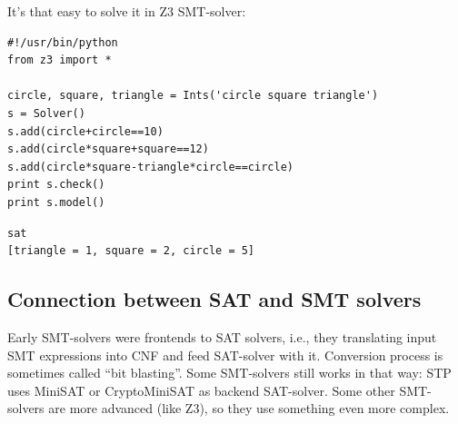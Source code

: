 It's that easy to solve it in Z3 \ac{SMT}-solver:

\begin{lstlisting}
#!/usr/bin/python
from z3 import *

circle, square, triangle = Ints('circle square triangle')
s = Solver()
s.add(circle+circle==10)
s.add(circle*square+square==12)
s.add(circle*square-triangle*circle==circle)
print s.check()
print s.model()
\end{lstlisting}

\begin{lstlisting}
sat
[triangle = 1, square = 2, circle = 5]
\end{lstlisting}



\subsection{Connection between \ac{SAT} and \ac{SMT} solvers}

Early \ac{SMT}-solvers were frontends to \ac{SAT} solvers, i.e., they translating input SMT expressions into \ac{CNF} and feed SAT-solver with it.
Conversion process is sometimes called ``bit blasting''.
Some \ac{SMT}-solvers still works in that way: STP uses MiniSAT or CryptoMiniSAT as backend SAT-solver.
Some other \ac{SMT}-solvers are more advanced (like Z3), so they use something even more complex.








